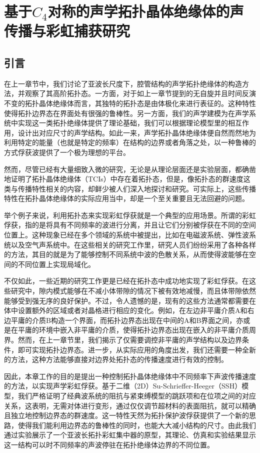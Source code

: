 \chapter{基于$C_4$对称的声学拓扑晶体绝缘体的声传播与彩虹捕获研究}
\section{引言}
在上一章节中，我们讨论了亚波长尺度下，腔管结构的声学拓扑绝缘体的构造方法，并观察了其高阶拓扑态。一方面，对于如上一章节提到的无自旋并且时间反演不变的拓扑晶体绝缘体而言，其独特的拓扑态是由体极化来进行表征的。这种特性使得拓扑边界态在界面处有很强的鲁棒性。另一方面，我们的声学建模为在声学系统中实现这一类拓扑绝缘体提供了理论基础，我们可以根据理论模型里的相互作用，设计出对应尺寸的声学结构。如此一来，声学拓扑晶体绝缘体便自然而然地为利用特定的能量（也就是特定的频率）在结构的边界或者角落之处，以一种鲁棒的方式俘获波提供了一个极为理想的平台。

然而，尽管已经有大量细致入微的研究，无论是从理论层面还是实验层面，都确凿地证明了拓扑晶体绝缘体（TCIs）中存在着拓扑态，但是，像拓扑态的群速度这类与传播特性相关的内容，却鲜少被人们深入地探讨和研究。可实际上，这些传播特性在拓扑晶体绝缘体的实际应用当中，却是一个至关重要且无法回避的问题。

举个例子来说，利用拓扑态来实现彩虹俘获就是一个典型的应用场景。所谓的彩虹俘获，指的是将具有不同频率的波进行分离，并且让它们分别被俘获在不同的空间位置上。这种现象已经在多个领域的系统中被提出，比如在电磁波系统\cite{C41-1,C41-2,C41-3,C41-4,C41-5,C41-6,C41-7,C41-8,C41-9}、弹性波系统\cite{C42-1,C42-2,C42-3,C42-4,C42-5,C42-6}以及空气声系统\cite{C43-1,C43-2,C43-3,C43-4}中。在这些相关的研究工作里，研究人员们纷纷采用了各种各样的方法，其目的就是为了能够控制不同系统中波的色散关系，从而使得波能够在空间的不同位置上实现局域化。

不仅如此，一些近期的研究工作更是已经在拓扑态中成功地实现了彩虹俘获\cite{C44-1,C44-2,C44-3,C44-4,C44-5,C44-6}。在这些研究中，隙内模式能够在不减小体带隙的情况下被有效地减慢，而且体带隙依然能够受到强无序的良好保护。不过，令人遗憾的是，现有的这些方法通常都需要在体中设置额外的区域或者对晶格进行相应的变化。例如，在左边非平庸介质A和右边平庸的介质B构造一个界面，而拓扑边界态出现在中间的A和B界面之间，亦或是在平庸的环境中嵌入非平庸的介质，使得拓扑边界态出现在嵌入的非平庸介质周界。然而，在上一章节里，我们揭示了仅需要调控非平庸的声学结构以及边界条件，即可实现拓扑边界态。进一步，从实际应用的角度出发，我们还需要一种全新的方法，这种方法能够直接对边界处拓扑态的传播速度进行有效的控制。

因此，本章工作的目的是提出一种控制拓扑晶体绝缘体中不同频率下声波传播速度的方法，以实现声学彩虹俘获。基于二维（2D）Su-Schrieffer-Heeger（SSH）模型，我们严格证明了经典波系统的阻抗与紧束缚模型的跳跃项和在位项之间的对应关系，这表明，无需对体进行变形，通过仅仅调节超材料的表面阻抗，就可以精确且独立地控制边界态的群速度。这一特性天然为拓扑保护波俘获提供了一个新的思路，使得我们能利用边界态的鲁棒性的同时，也能大大减小结构的尺寸。由此我们通过实验展示了一个亚波长拓扑彩虹集中器的原型，其理论、仿真和实验结果显示这一结构可以时不同频率的声波停驻在拓扑绝缘体边界的不同位置。


